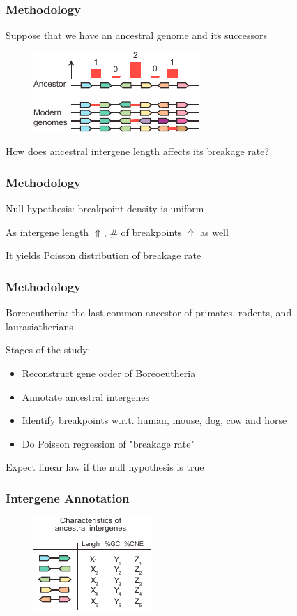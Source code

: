 \documentclass[svgnames,14pt]{beamer}
\begin{document}
\begin{frame}
\frametitle{Methodology}
Suppose that we have an ancestral genome and its successors
\begin{figure}
	\centering
	\includegraphics[scale = 2.20]{Ancestor.pdf}
\end{figure}

How does ancestral intergene length affects its breakage rate?
\end{frame}

\begin{frame}
\frametitle{Methodology}
Null hypothesis: breakpoint density is uniform

\vspace{12pt}
As intergene length $\Uparrow$, \# of breakpoints $\Uparrow$ as well

\vspace{12pt}
It yields Poisson distribution of breakage rate
\end{frame}

\begin{frame}
\frametitle{Methodology}
Boreoeutheria: the last common ancestor of primates, rodents, and laurasiatherians

\vspace{12pt}
Stages of the study:
\begin{itemize}
\item Reconstruct gene order of Boreoeutheria
\item Annotate ancestral intergenes
\item Identify breakpoints w.r.t. human, mouse, dog, cow and horse
\item Do Poisson regression of "breakage rate" 
\end{itemize}

\vspace{12pt}
Expect linear law if the null hypothesis is true
\end{frame}

\begin{frame}
\frametitle{Intergene Annotation}
\begin{figure}
	\centering
	\includegraphics[scale = 2.20]{Annotation.pdf}
\end{figure}
\end{frame}
\end{document}
